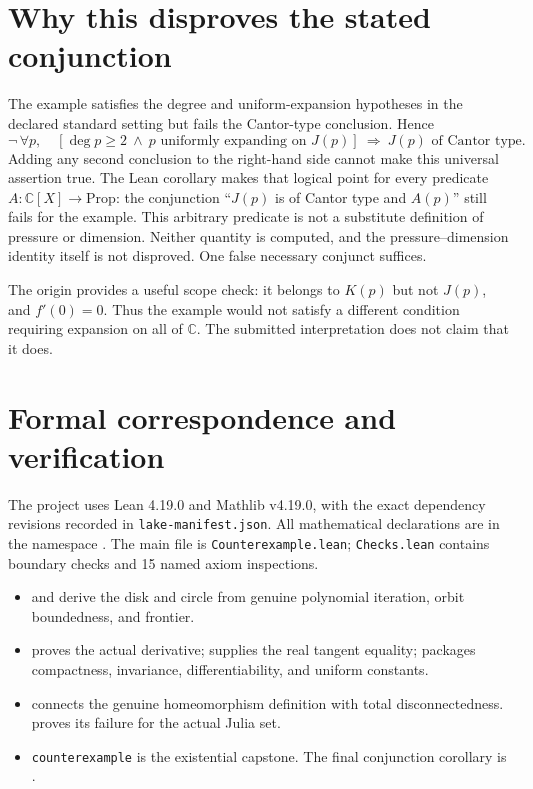 \documentclass[11pt]{article}
\newcommand{\C}{\mathbb C}
\newcommand{\J}{J}
\newcommand{\K}{K}
\begin{document}
\section{Why this disproves the stated conjunction}
The example satisfies the degree and uniform-expansion hypotheses in the
declared standard setting but fails the Cantor-type conclusion. Hence
\[
 \neg\,\forall p,\quad
 [\deg p\ge2\ \wedge\ p\text{ uniformly expanding on }\J(p)]
 \ \Longrightarrow\ \J(p)\text{ of Cantor type}.
\]
Adding any second conclusion to the right-hand side cannot make this
universal assertion true. The Lean corollary makes that logical point for
every predicate $A:\C[X]\to\mathrm{Prop}$: the conjunction
``$\J(p)$ is of Cantor type and $A(p)$'' still fails for the example.
This arbitrary predicate is not a substitute definition of pressure or
dimension. Neither quantity is computed, and the pressure--dimension identity
itself is not disproved. One false necessary conjunct suffices.

The origin provides a useful scope check: it belongs to $\K(p)$ but not
$\J(p)$, and $f'(0)=0$. Thus the example would not satisfy a different
condition requiring expansion on all of $\C$. The submitted interpretation
does not claim that it does.

\section{Formal correspondence and verification}
The project uses Lean 4.19.0 and Mathlib v4.19.0, with the exact dependency
revisions recorded in \texttt{lake-manifest.json}. All mathematical declarations
are in the namespace . The main file is
\texttt{Counterexample.lean}; \texttt{Checks.lean} contains boundary checks and
15 named axiom inspections.

\begin{itemize}
\item {} and  derive the disk
and circle from genuine polynomial iteration, orbit boundedness, and frontier.
\item {} proves the actual derivative;
 supplies the real tangent equality;
 packages compactness, invariance,
differentiability, and uniform constants.
\item {} connects the genuine
homeomorphism definition with total disconnectedness.
 proves its failure for the actual Julia set.
\item \texttt{counterexample} is the existential capstone. The final
conjunction corollary is
.
\end{itemize}
\end{document}
